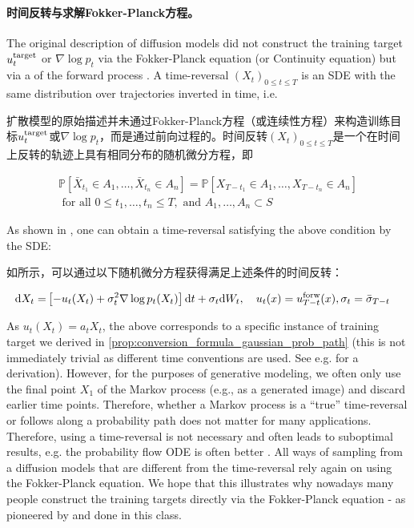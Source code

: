 \paragraph{时间反转与求解Fokker-Planck方程。}

The original description of diffusion models did not construct the training target $u^{\text{target}}_t$ or $\nabla\log p_t$ via the Fokker-Planck equation (or Continuity equation) but via a  of the forward process \citep{anderson1982reverse}. A time-reversal $(X_t)_{0\leq t\leq T}$ is an SDE with the same distribution over trajectories inverted in time, i.e.

扩散模型的原始描述并未通过Fokker-Planck方程（或连续性方程）来构造训练目标$u^{\text{target}}_t$或$\nabla\log p_t$，而是通过前向过程的\citep{anderson1982reverse}。时间反转$(X_t)_{0\leq t\leq T}$是一个在时间上反转的轨迹上具有相同分布的随机微分方程，即

\begin{align}
\mathbb{P}[\bar{X}_{t_1}\in A_1,\dots,\bar{X}_{t_n}\in A_n]=\mathbb{P}[X_{T-t_1}\in A_1,\dots,X_{T-t_n}\in A_n]\\
    \text{ for all }0\leq t_1,\dots, t_n\leq T, \text{ and } A_1,\dots,A_n\subset S
\end{align}

As shown in \citet{anderson1982reverse}, one can obtain a time-reversal satisfying the above condition by the SDE:

如\citet{anderson1982reverse}所示，可以通过以下随机微分方程获得满足上述条件的时间反转：

\begin{align*}
    \mathrm{d} X_t =& \left[-u_t(X_t)+\sigma_t^2\nabla\log p_t(X_t)\right]\mathrm{d} t+ \sigma_{t}\mathrm{d} W_t,\quad u_t(x)=u^{\text{forw}}_{T-t}(x),\sigma_t=\bar{\sigma}_{T-t}
\end{align*}

As $u_t(X_t)=a_tX_t$, the above corresponds to a specific instance of training target we derived in \cref{prop:conversion_formula_gaussian_prob_path} (this is not immediately trivial as different time conventions are used. See e.g. \citep{lipman2024flow} for a derivation). However, for the purposes of generative modeling, we often only use the final point $X_1$ of the Markov process (e.g., as a generated image) and discard earlier time points. Therefore, whether a Markov process is a ``true'' time-reversal or follows along a probability path does not matter for many applications. Therefore, using a time-reversal is not necessary and often leads to suboptimal results, e.g. the probability flow ODE is often better \citep{karras2022elucidating, ma2024sit}. All ways of sampling from a diffusion models that are different from the time-reversal rely again on using the Fokker-Planck equation. We hope that this illustrates why nowadays many people construct the training targets directly via the Fokker-Planck equation - as pioneered by \citep{lipman2022flow,liu2022flow,albergo2023stochastic} and done in this class.

